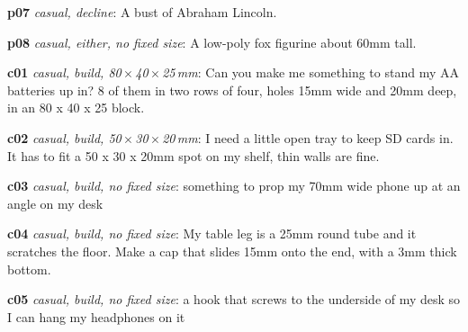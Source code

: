 {\noindent\textbf{p07} \emph{casual, decline}: A bust of Abraham Lincoln.\par
\noindent\textbf{p08} \emph{casual, either, no fixed size}: A low-poly fox figurine about 60mm tall.\par
\noindent\textbf{c01} \emph{casual, build, 80\,$\times$\,40\,$\times$\,25\,mm}: Can you make me something to stand my AA batteries up in? 8 of them in two rows of four, holes 15mm wide and 20mm deep, in an 80 x 40 x 25 block.\par
\noindent\textbf{c02} \emph{casual, build, 50\,$\times$\,30\,$\times$\,20\,mm}: I need a little open tray to keep SD cards in. It has to fit a 50 x 30 x 20mm spot on my shelf, thin walls are fine.\par
\noindent\textbf{c03} \emph{casual, build, no fixed size}: something to prop my 70mm wide phone up at an angle on my desk\par
\noindent\textbf{c04} \emph{casual, build, no fixed size}: My table leg is a 25mm round tube and it scratches the floor. Make a cap that slides 15mm onto the end, with a 3mm thick bottom.\par
\noindent\textbf{c05} \emph{casual, build, no fixed size}: a hook that screws to the underside of my desk so I can hang my headphones on it\par
}
